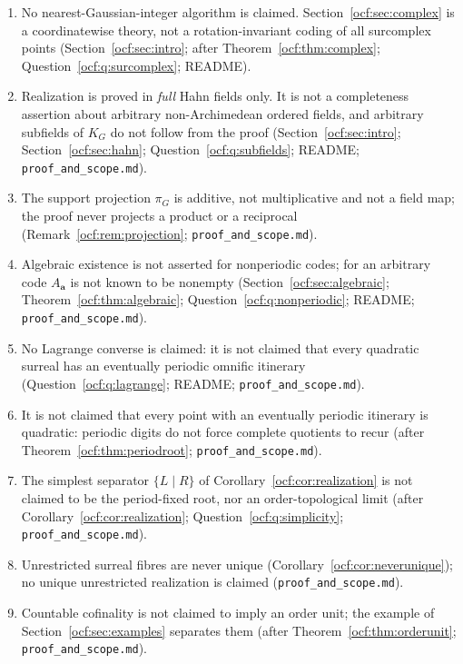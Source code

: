 \documentclass[11pt,a4paper]{article}
\numberwithin{equation}{section}
\theoremstyle{definition}
\theoremstyle{remark}
\newcommand{\codea}{\boldsymbol a}
\newcommand{\rpath}[1]{\nolinkurl{#1}}%
\begin{document}
\begin{enumerate}[label=S\arabic*.,leftmargin=2.6em,itemsep=2pt]
natural number. No limit-stage continuation of the algorithm is included or
claimed (Section~\ref{ocf:sec:intro}; Question~\ref{ocf:q:transfinite};
README).
\item No nearest-Gaussian-integer algorithm is claimed. Section~\ref{ocf:sec:complex}
is a coordinatewise theory, not a rotation-invariant coding of all
surcomplex points (Section~\ref{ocf:sec:intro}; after
Theorem~\ref{ocf:thm:complex}; Question~\ref{ocf:q:surcomplex}; README).
\item Realization is proved in \emph{full} Hahn fields only. It is not a
completeness assertion about arbitrary non-Archimedean ordered fields, and
arbitrary subfields of $K_G$ do not follow from the proof
(Section~\ref{ocf:sec:intro}; Section~\ref{ocf:sec:hahn};
Question~\ref{ocf:q:subfields}; README; \rpath{proof\_and\_scope.md}).
\item The support projection $\pi_G$ is additive, not multiplicative and not
a field map; the proof never projects a product or a reciprocal
(Remark~\ref{ocf:rem:projection}; \rpath{proof\_and\_scope.md}).
\item Algebraic existence is not asserted for nonperiodic codes; for an
arbitrary code $A_{\codea}$ is not known to be nonempty
(Section~\ref{ocf:sec:algebraic}; Theorem~\ref{ocf:thm:algebraic};
Question~\ref{ocf:q:nonperiodic}; README; \rpath{proof\_and\_scope.md}).
\item No Lagrange converse is claimed: it is not claimed that every quadratic
surreal has an eventually periodic omnific itinerary
(Question~\ref{ocf:q:lagrange}; README; \rpath{proof\_and\_scope.md}).
\item It is not claimed that every point with an eventually periodic
itinerary is quadratic: periodic digits do not force complete quotients to
recur (after Theorem~\ref{ocf:thm:periodroot}; \rpath{proof\_and\_scope.md}).
\item The simplest separator $\{L\mid R\}$ of Corollary~\ref{ocf:cor:realization}
is not claimed to be the period-fixed root, nor an order-topological limit
(after Corollary~\ref{ocf:cor:realization}; Question~\ref{ocf:q:simplicity};
\rpath{proof\_and\_scope.md}).
\item Unrestricted surreal fibres are never unique
(Corollary~\ref{ocf:cor:neverunique}); no unique unrestricted realization
is claimed (\rpath{proof\_and\_scope.md}).
\item Countable cofinality is not claimed to imply an order unit; the example of
Section~\ref{ocf:sec:examples} separates them (after
Theorem~\ref{ocf:thm:orderunit}; \rpath{proof\_and\_scope.md}).

\end{enumerate}
\end{document}
